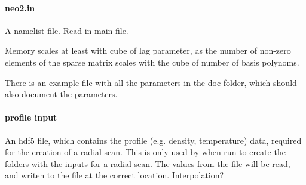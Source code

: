 \paragraph{neo2.in}
A namelist file.
Read in main file.

Memory scales at least with cube of lag parameter, as the number of
non-zero elements of the sparse matrix scales with the cube of number of
basis polynoms.

There is an example file with all the parameters in the doc folder,
which should also document the parameters.

\paragraph{profile input}
An hdf5 file, which contains the profile (e.g. density, temperature)
data, required for the creation of a radial scan.
This is only used by \neotwo when run to create the folders with the
inputs for a radial scan.
The values from the file will be read, and writen to the 
file at the correct location. Interpolation?
